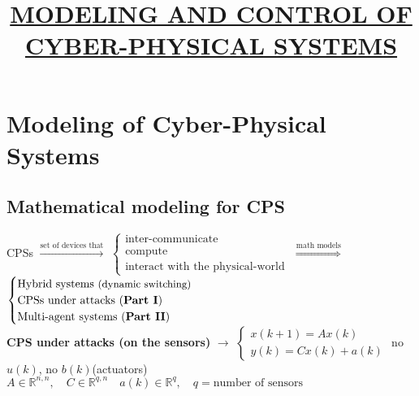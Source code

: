 \documentclass[a4paper, 12pt]{article}
\title{
    \vspace{-1.5cm}
    \textbf{
        \large{
            \underline{MODELING AND CONTROL OF CYBER-PHYSICAL SYSTEMS}
   \vspace{-10ex}
        }
    }
}
\author{}
\date{}
\begin{document}
\maketitle
\vspace{0.15cm}
\section{Modeling of Cyber-Physical Systems}

{\color{red} \subsection*{Mathematical modeling for CPS}}
CPSs $\overset{\text{set of devices that}}{\longrightarrow}$ 
$\begin{cases}
    \text{inter-communicate}\\
    \text{compute}\\
    \text{interact with the physical-world}
\end{cases} 
    $ $\overset{\text{math models}}{\Longrightarrow}$
$
\begin{cases}
    \text{Hybrid systems {\small(dynamic switching)}}\\
    \text{CPSs under attacks (\textbf{Part I})}\\ 
    \text{Multi-agent systems (\textbf{Part II})}
\end{cases}
$\\
\textbf{CPS under attacks (on the sensors)} $\longrightarrow$ 
$\begin{cases}
    x(k+1)=Ax(k)\\
    y(k)=Cx(k)+a(k)
\end{cases}$  no $u(k)$, no $b(k)$(actuators)
$A \in \mathbb{R}^{n,n}, \quad C \in \mathbb{R}^{q,n} \quad 
a(k)\in \mathbb{R}^q, \quad q=\text{number of sensors}$\\
\end{document}
